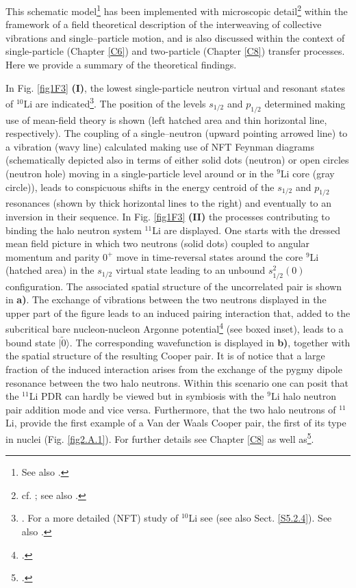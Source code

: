  
 
 This schematic model\footnote{See also \cite{Broglia:19b}.} has been implemented with microscopic detail\footnote{cf. \cite{Barranco:01}; see also \cite{Potel:10}.} within the framework of a field theoretical description of the interweaving of collective vibrations and single--particle motion, and is also discussed  within the context of single-particle (Chapter \ref{C6}) and two-particle (Chapter \ref{C8}) transfer processes. Here we provide a summary of the theoretical findings. 
 
 
 
 
 In Fig. \ref{fig1F3} \textbf{(I)}, the lowest single-particle neutron virtual and resonant states of  $^{10}$Li are indicated\footnote{\cite{Barranco:01}. For a more detailed (NFT) study of $^{10}$Li see \cite{Barranco:20} (see also Sect. \ref{S5.2.4}). See also \cite{Moro:19}.}. The 
  position of the levels $s_{1/2}$ and $p_{1/2}$ determined making use
 of mean-field theory is shown (left hatched area and thin horizontal
 line, respectively). The coupling of a single--neutron (upward
 pointing arrowed line) to a vibration (wavy line) calculated
 making use of NFT Feynman diagrams 
 (schematically depicted also in terms of either solid dots (neutron)
 or open circles (neutron hole) moving in a single-particle
 level around or in the $^9$Li core (gray circle)), leads to conspicuous
 shifts in the energy centroid of the $s_{1/2}$ and $p_{1/2}$ resonances
 (shown by thick horizontal lines to the right) and eventually to
 an inversion in their sequence. In Fig. \ref{fig1F3} \textbf{(II)} the  processes contributing to  binding the  halo neutron system $^{11}$Li are displayed. One starts with the dressed mean  field
 picture in which two neutrons (solid dots) coupled to angular momentum and parity $0^+$ move in
 time-reversal states around the core $^{9}$Li (hatched area) in the
 $s_{1/2}$ virtual state leading to an unbound $s^2
 _{1/2}(0)$ configuration.  The associated spatial structure of the uncorrelated pair is shown in \textbf{a)}. The exchange
 of vibrations between the two neutrons displayed in the upper
 part of the figure leads to an induced pairing interaction
 that, added to the subcritical bare nucleon-nucleon Argonne potential\footnote{\cite{Wiringa:84}.}  (see boxed inset), leads to a bound state $|\tilde 0\rangle$. The corresponding   wavefunction is  displayed in \textbf{b)}, together with the spatial structure of the resulting Cooper pair. It is of notice that a large fraction of the induced interaction arises from the exchange of the pygmy dipole resonance between the two halo neutrons.  Within this scenario one can posit that the $^{11}$Li PDR  can hardly be viewed but in symbiosis with the $^{9}$Li halo neutron pair addition mode and vice versa. Furthermore, that the two halo neutrons of $^{11}$Li, provide the first example of a Van der Waals Cooper pair, the first of its type in nuclei (Fig. \ref{fig2.A.1}). For further details see Chapter \ref{C8} as well as\footnote{\cite{Barranco:01}.}.
